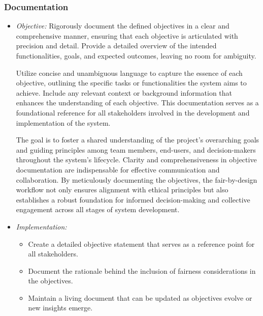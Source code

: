 \subsubsection{Documentation}

\begin{itemize}

    \item \emph{Objective:} Rigorously document the defined objectives in a clear and comprehensive manner, ensuring that each objective is articulated with precision and detail. Provide a detailed overview of the intended functionalities, goals, and expected outcomes, leaving no room for ambiguity.

    Utilize concise and unambiguous language to capture the essence of each objective, outlining the specific tasks or functionalities the system aims to achieve. Include any relevant context or background information that enhances the understanding of each objective. This documentation serves as a foundational reference for all stakeholders involved in the development and implementation of the system.

    The goal is to foster a shared understanding of the project's overarching goals and guiding principles among team members, end-users, and decision-makers throughout the system's lifecycle. Clarity and comprehensiveness in objective documentation are indispensable for effective communication and collaboration. By meticulously documenting the objectives, the fair-by-design workflow not only ensures alignment with ethical principles but also establishes a robust foundation for informed decision-making and collective engagement across all stages of system development.
    
    \item \emph{Implementation:}

        \begin{itemize}

            \item Create a detailed objective statement that serves as a reference point for all stakeholders.

            \item Document the rationale behind the inclusion of fairness considerations in the objectives.

            \item Maintain a living document that can be updated as objectives evolve or new insights emerge.

        \end{itemize}

\end{itemize}

